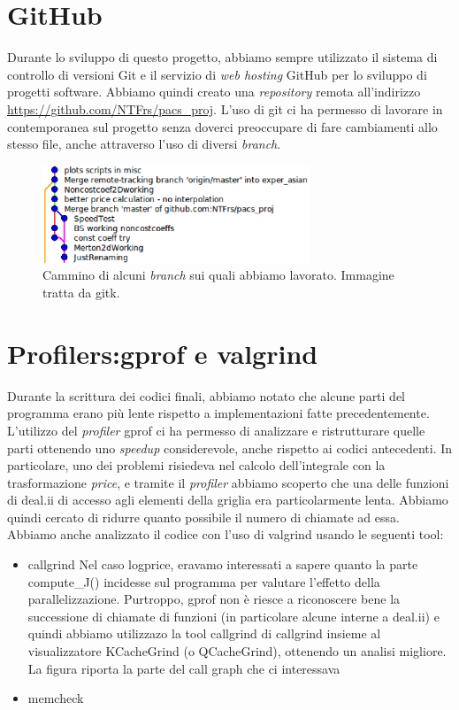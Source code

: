\documentclass[a4paper,10pt]{report}
\theoremstyle{plain}
\theoremstyle{definition}
\theoremstyle{remark}
\begin{document}
\section{GitHub}
Durante lo sviluppo di questo progetto, abbiamo sempre utilizzato il sistema di controllo di versioni Git e il servizio di \emph{web hosting} GitHub per lo sviluppo di progetti software. Abbiamo quindi creato una \emph{repository} remota all'indirizzo \url{https://github.com/NTFrs/pacs_proj}. L'uso di git ci ha permesso di lavorare in contemporanea sul progetto senza doverci preoccupare di fare cambiamenti allo stesso file, anche attraverso l'uso di diversi \emph{branch}.
\begin{figure}[!h]
 \begin{center}
 \includegraphics[width=8cm]{img/Git.eps}
 \caption{Cammino di alcuni \emph{branch} sui quali abbiamo lavorato. Immagine tratta da \textsf{gitk}.}
 \label{fig:gitk}
 \end{center}
\end{figure}

\section{Profilers:\textsf{gprof} e \textsf{valgrind}}
Durante la scrittura dei codici finali, abbiamo notato che alcune parti del programma erano più lente rispetto a implementazioni fatte precedentemente. L'utilizzo del \emph{profiler} \textsf{gprof} ci ha permesso di analizzare e ristrutturare quelle parti ottenendo uno \emph{speedup} considerevole, anche rispetto ai codici antecedenti. In particolare, uno dei problemi risiedeva nel calcolo dell'integrale con la trasformazione \emph{price}, e tramite il \emph{profiler} abbiamo scoperto che una delle funzioni di \textsf{deal.ii} di accesso agli elementi della griglia era particolarmente lenta. Abbiamo quindi cercato di ridurre quanto possibile il numero di chiamate ad essa.\\
Abbiamo anche analizzato il codice con l'uso di \textsf{valgrind} usando le seguenti tool:
\begin{itemize}
 \item \textsf{callgrind} Nel caso logprice, eravamo interessati a sapere quanto la parte \textsf{compute\_J()} incidesse sul programma per valutare l'effetto della parallelizzazione. Purtroppo, \textsf{gprof} non è riesce a riconoscere bene la successione di chiamate di funzioni (in particolare alcune interne a deal.ii) e quindi abbiamo utilizzazo la tool \textsf{callgrind} di \textsf{callgrind} insieme al visualizzatore \textsf{KCacheGrind} (o \textsf{QCacheGrind}), ottenendo un analisi migliore. La figura riporta la parte del call graph che ci interessava
 \item {}\textsf{memcheck}  
\end{itemize}
\end{document}
